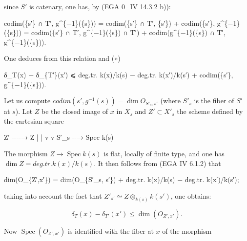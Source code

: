 \documentclass[
]{article}
\newenvironment{Shaded}{}{}
\newcommand{\NormalTok}[1]{#1}
\begin{document}
since \(S'\) is catenary, one has, by (EGA 0\_IV 14.3.2 b)):

\begin{Shaded}
\begin{Highlighting}[]
\NormalTok{codim(\{s′\} ∩ T′, g\^{}\{−1\}(\{s\})) = codim(\{s′\} ∩ T′, \{s′\}) + codim(\{s′\}, g\^{}\{−1\}(\{s\}))}
\NormalTok{   = codim(\{s′\} ∩ T′, g\^{}\{−1\}(\{s\}) ∩ T′) + codim(g\^{}\{−1\}(\{s\}) ∩ T′, g\^{}\{−1\}(\{s\})).}
\end{Highlighting}
\end{Shaded}

One deduces from this relation and (∗)

\begin{Shaded}
\begin{Highlighting}[]
\NormalTok{δ\_T(x) − δ\_\{T′\}(x′) ⩽ deg.tr. k(x)/k(s) − deg.tr. k(x′)/k(s′) + codim(\{s′\}, g\^{}\{−1\}(\{s\})).}
\end{Highlighting}
\end{Shaded}

Let us compute \(codim({s'}, g^{-1}({s})) = \dim O_{S'_{s}, s'}\) (where
\(S'_{s}\) is the fiber of \(S'\) at \(s\)). Let \(Z\) be the closed
image of \(x\) in \(X_{s}\) and \(Z' \subset X'_{s}\) the scheme defined
by the cartesian square

\begin{Shaded}
\begin{Highlighting}[]
\NormalTok{Z′ {-}{-}{-}{-}→ Z}
\NormalTok{|        |}
\NormalTok{v        v}
\NormalTok{S′\_s {-}{-}→ Spec k(s)}
\end{Highlighting}
\end{Shaded}

The morphism \(Z \to \operatorname{Spec} k(s)\) is flat, locally of
finite type, and one has \(\dim Z = deg.tr. k(x)/k(s)\). It then follows
from (EGA IV 6.1.2) that

\begin{Shaded}
\begin{Highlighting}[]
\NormalTok{dim(O\_\{Z′,x′\}) = dim(O\_\{S′\_s, s′\}) + deg.tr. k(x)/k(s) − deg.tr. k(x′)/k(s′);}
\end{Highlighting}
\end{Shaded}

taking into account the fact that
\(Z'_{s'} \simeq Z \otimes_{k(s)} k(s')\), one obtains:

\[
\delta_{T}(x) - \delta_{T'}(x') \leqslant \dim(O_{Z',x'}).
\]

Now \(\operatorname{Spec}(O_{Z',x'})\) is identified with the fiber at
\(x\) of the morphism
\end{document}
